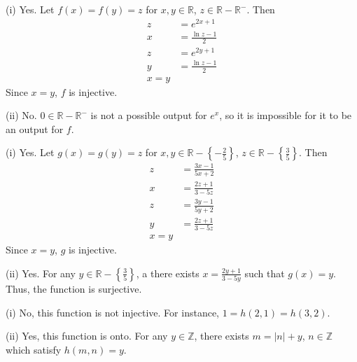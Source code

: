 \documentclass[12pt]{exam}
\newcommand{\reals}{\mathbb{R}}
\newcommand{\ints}{\mathbb{Z}}
\begin{document}
\begin{solution}
    \begin{qparts}
        \item (i) Yes. Let $f(x) = f(y) = z$ for $x, y \in \reals$, $z \in \mathbb R - \mathbb R^-$. Then \begin{align*}
            z &= e^{2x+1} \\
            x &= \frac{\ln z - 1}{2} \\
            z &= e^{2y+1} \\
            y &= \frac{\ln z - 1}{2} \\
            x = y
        \end{align*}
        Since $x = y$, $f$ is injective.
        \par (ii) No. $0 \in \mathbb R - \mathbb R^-$ is not a possible output for $e^x$, so it is impossible for it to be an output for $f$.
    
        \item (i) Yes. Let $g(x) = g(y) = z$ for $x, y \in \mathbb{R} - \left\{-\frac{2}{5}\right\}$, $z \in \mathbb R - \left\{\frac{3}{5}\right\}$. Then \begin{align*}
            z &= \frac{3x - 1}{5x + 2} \\
            x &= \frac{2z+1}{3-5z} \\
            z &= \frac{3y - 1}{5y + 2} \\
            y &= \frac{2z+1}{3-5z} \\
            x = y
        \end{align*}
        Since $x = y$, $g$ is injective.
        \par (ii) Yes. For any $y \in \reals - \left\{\frac{3}{5}\right\}$, a there exists $x = \frac{2y+1}{3-5y}$ such that $g(x) = y$. Thus, the function is surjective.
    
        \item (i) No, this function is not injective. For instance, $1 = h(2, 1) = h(3, 2)$.
        \par (ii) Yes, this function is onto. For any $y \in \ints$, there exists $m = |n| + y$, $n \in \ints$ which satisfy $h(m, n) = y$.
    \end{qparts}
\end{solution}

\clearpage
\end{document}
